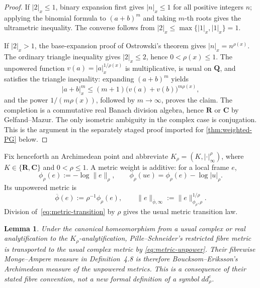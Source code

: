 \documentclass[11pt]{article}
\newtheorem{lemma}[theorem]{Lemma}
\newcommand{\R}{\mathbf R}
\newcommand{\C}{\mathbf C}
\newcommand{\norm}[1]{\lVert#1\rVert}
\newcommand{\abs}[1]{\lvert#1\rvert}
\begin{document}
\begin{proof}
If $\abs{2}_x\leq1$, binary expansion first gives
$\abs{n}_x\leq1$ for all positive integers $n$; applying the binomial
formula to $(a+b)^m$ and taking $m$-th roots gives the ultrametric
inequality.  The converse follows from
$\abs{2}_x\leq\max\{\abs1_x,\abs1_x\}=1$.

If $\abs2_x>1$, the base-expansion proof of Ostrowski's theorem gives
$\abs n_x=n^{\rho(x)}$.  The ordinary triangle inequality gives
$\abs2_x\leq2$, hence $0<\rho(x)\leq1$.  The unpowered function
$v(a)=\abs a_x^{1/\rho(x)}$ is multiplicative, is usual on $\mathbf Q$,
and satisfies the triangle inequality: expanding $(a+b)^m$ yields
\[
 \abs{a+b}_x^m\leq(m+1)
 \bigl(v(a)+v(b)\bigr)^{m\rho(x)},
\]
and the power $1/(m\rho(x))$, followed by $m\to\infty$, proves the
claim.  The completion is a commutative real Banach division algebra, hence
$\R$ or $\C$ by Gelfand--Mazur.  The only isometric ambiguity in the
complex case is conjugation.  This is the argument in the separately staged
proof imported for \cref{thm:weighted-PG} below.
\end{proof}

Fix henceforth an Archimedean point and abbreviate
$K_\rho=(K,\abs{\cdot}_\infty^\rho)$, where
$K\in\{\R,\C\}$ and $0<\rho\leq1$.  A metric weight is
additive: for a local frame $e$,
\[
 \phi_\rho(e):=-\log\norm e_\rho,
 \qquad
 \phi_\rho(ue)=\phi_\rho(e)-\log\abs u_\rho.
\tag{1.3}\label{eq:metric-transition}
\]
Its unpowered metric is
\begin{equation}
 \overline\phi(e):=\rho^{-1}\phi_\rho(e),
 \qquad
 \norm e_{\overline\phi,\infty}:=\norm e_{\phi_\rho,\rho}^{1/\rho}.
\tag{1.4}\label{eq:metric-unpower}
\end{equation}
Division of~\eqref{eq:metric-transition} by $\rho$ gives the usual metric
transition law.

\begin{lemma}
\label{lem:PS-transport}
Under the canonical homeomorphism from a usual complex or real
analytification to the $K_\rho$-analytification, Pille--Schneider's
restricted fibre metric is transported to the usual complex metric by
\eqref{eq:metric-unpower}.  Their fibrewise Monge--Ampere measure in
Definition~4.8 is therefore Boucksom--Eriksson's Archimedean measure of the
unpowered metrics.  This is a consequence of their stated fibre convention,
not a new formal definition of a symbol $dd^c_\rho$.
\end{lemma}
\end{document}
